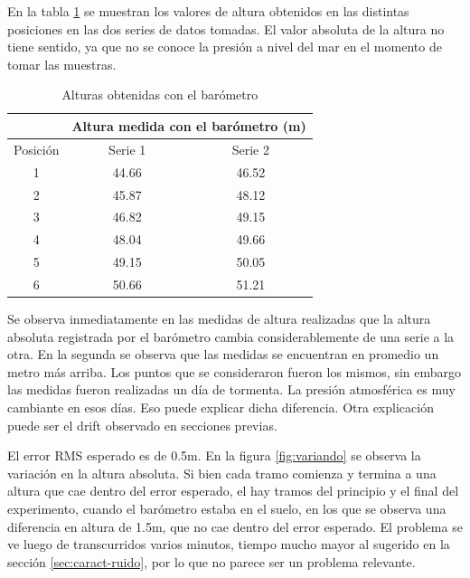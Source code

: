 \documentclass[spanish,12pt,a4paper,titlepage]{report}
\begin{document}

En la tabla \ref{tab:alturasm} se muestran los valores de altura obtenidos en las distintas posiciones en las dos series de datos tomadas. El valor absoluta de la altura no tiene sentido, ya que no se conoce la presión a nivel del mar en el momento de tomar las muestras.

\begin{table}[H]
\centering
\begin{tabular}{c|c|c|} 
	& \multicolumn{2}{|p{200pt}|}{\cellcolor[gray]{0.8} Altura medida con el barómetro (m)}      \\ \hline
\cellcolor[gray]{0.8} {Posición} & \cellcolor[gray]{0.8} {Serie 1} &\cellcolor[gray]{0.8} {Serie 2}\\ \hline

\multicolumn{1}{|c|}{1} & 44.66 & 46.52 \\ \hline
\multicolumn{1}{|c|}{2} & 45.87 & 48.12\\ \hline
\multicolumn{1}{|c|}{3} & 46.82 & 49.15\\ \hline
\multicolumn{1}{|c|}{4} & 48.04 & 49.66\\ \hline
\multicolumn{1}{|c|}{5} & 49.15 & 50.05\\ \hline
\multicolumn{1}{|c|}{6} & 50.66 & 51.21 \\ \hline

\end{tabular}
\caption{Alturas obtenidas con el barómetro}
\label{tab:alturasm}
\end{table}

Se observa inmediatamente en las medidas de altura realizadas que la altura absoluta registrada por el barómetro cambia considerablemente de una serie a la otra. En la segunda se observa que las medidas se encuentran en promedio un metro más arriba. Los puntos que se consideraron fueron los mismos, sin embargo las medidas fueron realizadas un día de tormenta. La presión atmosférica es muy cambiante en esos días. Eso puede explicar dicha diferencia. Otra explicación puede ser el drift observado en secciones previas.

El error RMS esperado es de 0.5m. En la figura \ref{fig:variando} se observa la variación en la altura absoluta. Si bien cada tramo comienza y termina a una altura que cae dentro del error esperado, el hay tramos del principio y el final del experimento, cuando el barómetro estaba en el suelo, en los que se observa una diferencia en altura de 1.5m, que no cae dentro del error esperado. El problema se ve luego de transcurridos varios minutos, tiempo mucho mayor al sugerido en la sección \ref{sec:caract-ruido}, por lo que no parece ser un problema relevante.
\end{document}
